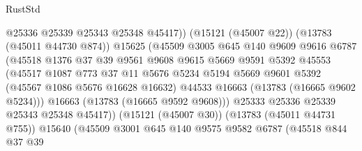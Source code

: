 \begin{lexlean}{RustStd}
\begin{coremodule}
                                  @25336
                                  @25339
                                  @25343
                                  @25348
                                  @45417))
                              (@15121 (@45007 @22))
                              (@13783 (@45011 @44730 @874))
                              @15625
                              (@45509
                                @3005
                                @645
                                @140
                                @9609
                                @9616
                                @6787
                                (@45518
                                  @1376
                                  @37
                                  @39
                                  @9561
                                  @9608
                                  @9615
                                  @5669
                                  @9591
                                  @5392
                                  @45553
                                  (@45517
                                    @1087
                                    @773
                                    @37
                                    @11
                                    @5676
                                    @5234
                                    @5194
                                    @5669
                                    @9601
                                    @5392
                                    (@45567 @1086 @5676 @16628 @16632)
                                    @44533
                                    @16663
                                    (@13783 (@16665 @9602 @5234)))
                                  @16663
                                  (@13783 (@16665 @9592 @9608)))
                                @25333
                                @25336
                                @25339
                                @25343
                                @25348
                                @45417))
                            (@15121 (@45007 @30))
                            (@13783 (@45011 @44731 @755))
                            @15640
                            (@45509
                              @3001
                              @645
                              @140
                              @9575
                              @9582
                              @6787
                              (@45518
                                @844
                                @37
                                @39

\end{coremodule}
\end{lexlean}
